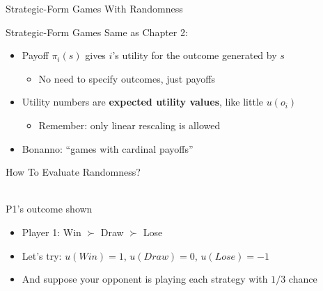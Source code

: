 
\begin{frame}[standout]
Strategic-Form Games With Randomness
\end{frame}

\begin{frame}{Strategic-Form Games}
Same as Chapter 2:
\bsk
\centering
{}
\bsk
\raggedright
\vspace{0.2in}
\begin{itemize}
    \item Payoff $\pi_i(s)$ gives $i$'s utility for the outcome generated by $s$
    \begin{itemize}
        \item No need to specify outcomes, just payoffs
    \end{itemize}
    \item Utility numbers are \textbf{expected utility values}, like little $u(o_i)$
    \begin{itemize}
        \item Remember: only linear rescaling is allowed
    \end{itemize}
    \item Bonanno: ``games with cardinal payoffs''
\end{itemize}
\end{frame}

\begin{frame}{How To Evaluate Randomness?}
\begin{center}
\begin{matrixgame}[top={Rock,Paper,Scissors}, left={Rock,Paper,Scissors}]
\end{matrixgame}\\
P1's outcome shown
\end{center}
\bsk
\begin{itemize}
    \item<2-> Player 1: Win $\succ$ Draw $\succ$ Lose
    \item<3-> Let's try: $u(Win)=1$, $u(Draw)=0$, $u(Lose)=-1$
    \item<4-> And suppose your opponent is playing each strategy with $1/3$ chance
\end{itemize}
\end{frame}

